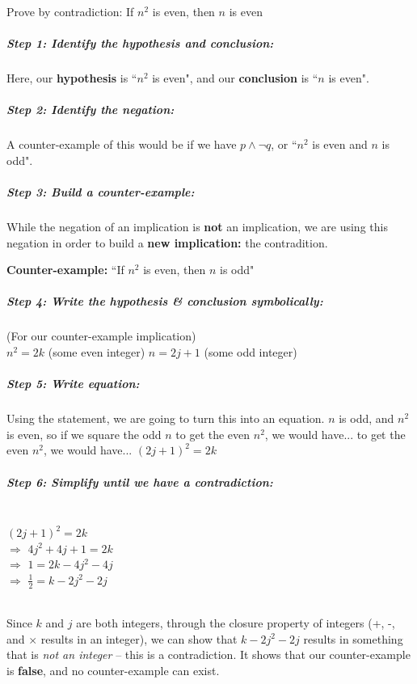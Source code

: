 \documentclass[a4paper,12pt]{book}
\begin{document}
        \begin{intro}{Prove by contradiction: If $n^{2}$ is even, then $n$ is even}

            \subparagraph{Step 1: Identify the hypothesis and conclusion:}
            Here, our \textbf{hypothesis} is ``$n^{2}$ is even",
            and our \textbf{conclusion} is ``$n$ is even".

            \subparagraph{Step 2: Identify the negation:}
            A counter-example of this would be if we have $p \land \neg q$,
            or ``$n^{2}$ is even and $n$ is odd".

            \subparagraph{Step 3: Build a counter-example:}
            While the negation of an implication is \textbf{not} an implication,
            we are using this negation in order to build a \textbf{new implication:}
            the contradition.

            \textbf{Counter-example:} ``If $n^{2}$ is even, then $n$ is odd"

            \subparagraph{Step 4: Write the hypothesis \& conclusion symbolically:}
            (For our counter-example implication) \\
            $n^{2} = 2k$ (some even integer) \tab{}
            $n = 2j + 1$ (some odd integer)

            \subparagraph{Step 5: Write equation:}
            Using the statement, we are going to turn this into an equation.
            $n$ is odd, and $n^{2}$ is even, so if we square the odd $n$
            to get the even $n^{2}$, we would have...
            to get the even $n^{2}$, we would have...
            $(2j + 1)^{2} = 2k$

            \subparagraph{Step 6: Simplify until we have a contradiction:} ~\\
            $(2j + 1)^{2} = 2k$ \\
            \tab[0.5cm] $\Rightarrow$ \tab[0.5cm]
            $4j^{2} + 4j + 1 = 2k$ \\
            \tab[0.5cm] $\Rightarrow$ \tab[0.5cm]
            $1 = 2k - 4j^{2} - 4j$ \\
            \tab[0.5cm] $\Rightarrow$ \tab[0.5cm]
            $\frac{1}{2} = k - 2j^{2} - 2j$

            ~\\
            Since $k$ and $j$ are both integers, through the closure property
            of integers (+, -, and $\times$ results in an integer),
            we can show that $k - 2j^{2} - 2j$ results in something that
            is \textit{not an integer} -- this is a contradiction.
            It shows that our counter-example
            is \textbf{false}, and no counter-example can exist.
        \end{intro}
\end{document}
